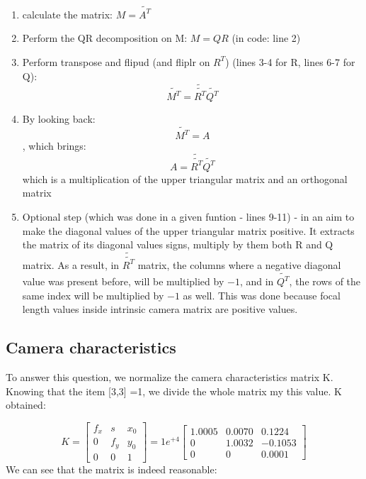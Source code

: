 \documentclass[a4paper]{iacas}
\begin{document}
\begin{enumerate}
\item calculate the matrix: $M = \tilde{A^{T}}$
\item Perform the QR  decomposition on M: $M = QR$   (in code: line 2)
\item Perform transpose and flipud (and fliplr on $R^{T}$) (lines 3-4 for R, lines 6-7 for Q): $$\tilde{M^{T}} = \tilde{\tilde{R^{T}}}\tilde{Q^{T}}$$
\item By looking back: $$\tilde{M^{T}} = A$$, which brings: $$A = \tilde{\tilde{R^{T}}}\tilde{Q^{T}}$$
which is a multiplication of the upper triangular matrix and an orthogonal matrix
\item Optional step (which was done in a given funtion - lines 9-11) - in an aim to make the diagonal values of the upper triangular matrix positive. It extracts the matrix of its diagonal values signs, multiply by them both R and Q matrix.\newline
As a result, in $\tilde{\tilde{R^{T}}}$ matrix, the columns where a negative diagonal value was present before, will be multiplied by $-1$, and in $\tilde{Q^{T}}$, the rows of the same index will be multiplied by $-1$ as well. 
This was done because focal length values inside intrinsic camera matrix are positive values.

\end{enumerate}


\subsection{Camera characteristics}
To answer this question, we normalize the camera characteristics matrix K. Knowing that the item [3,3] =1, we divide the whole matrix my this value. K obtained:

\begin{equation*}
K = 
\left[
\begin{matrix}
f_{x} & s &  x_{0}\\
0 & f_{y} & y_{0} \\
0 & 0 & 1
\end{matrix}
\right]
=
1e^{+4}
\left[
\begin{matrix}
    1.0005&    0.0070&    0.1224 \\
         0&    1.0032&   -0.1053 \\
         0&         0&    0.0001
\end{matrix}
\right]
\end{equation*}
We can see that the matrix is indeed reasonable:
\end{document}

